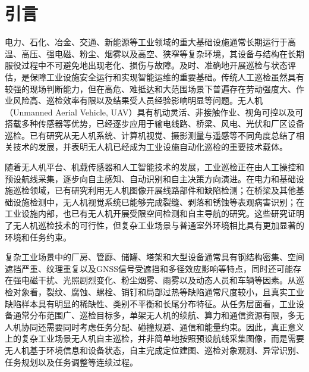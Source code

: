 \section{引言}

电力、石化、冶金、交通、新能源等工业领域的重大基础设施通常长期运行于高温、高压、强电磁、粉尘、烟雾以及高空、狭窄等复杂环境，其设备与结构在长期服役过程中不可避免地出现老化、损伤与故障。及时、准确地开展巡检与状态评估，是保障工业设施安全运行和实现智能运维的重要基础。传统人工巡检虽然具有较强的现场判断能力，但在高危、难抵达和大范围场景下普遍存在劳动强度大、作业风险高、巡检效率有限以及结果受人员经验影响明显等问题。无人机（Unmanned Aerial Vehicle, UAV）具有机动灵活、非接触作业、视角可控以及可搭载多种传感器等优势，已经逐步应用于输电线路、桥梁、风电、光伏和厂区设备巡检\cite{shakhatreh2019survey,floreano2015science,kumar2012opportunities,cai2014survey,kendoul2012survey}。已有研究从无人机系统、计算机视觉、摄影测量与遥感等不同角度总结了相关技术的发展，并表明无人机已经成为工业设施自动化巡检的重要技术载体\cite{kanellakis2017survey,colomina2014unmanned,nex2014uav}。

随着无人机平台、机载传感器和人工智能技术的发展，工业巡检正在由人工操控和预设航线采集，逐步向自主感知、自动识别和自主决策方向演进。在电力和基础设施巡检领域，已有研究利用无人机图像开展线路部件和缺陷检测\cite{nguyen2018automatic,miao2020uav,zhouwq2024review}；在桥梁及其他基础设施检测中，无人机视觉系统已能够完成裂缝、剥落和锈蚀等表观病害识别\cite{morgenthal2014quality,ham2016visual,dorafshan2018bridge,spencer2019advances}；在工业设施内部，也已有无人机开展受限空间检测和自主导航的研究\cite{nikolic2013uav,ozaslan2017autonomous,petrlik2020robust}。这些研究证明了无人机巡检技术的可行性，但复杂工业场景与普通室外环境相比具有更加显著的环境和任务约束。

复杂工业场景中的厂房、管廊、储罐、塔架和大型设备通常具有钢结构密集、空间遮挡严重、纹理重复以及GNSS信号受遮挡和多径效应影响等特点，同时还可能存在强电磁干扰、光照剧烈变化、粉尘烟雾、雨雾以及动态人员和车辆等因素\cite{scaramuzza2014vision,stoecker2017review,lvyang2019sense}。从巡检对象看，裂纹、腐蚀、螺栓、销钉和局部过热等缺陷通常尺度较小，且真实工业缺陷样本具有明显的稀缺性、类别不平衡和长尾分布特征\cite{taox2021survey,nguyen2018automatic}。从任务层面看，工业设备通常分布范围广、巡检目标多，单架无人机的续航、算力和通信资源有限，多无人机协同还需要同时考虑任务分配、碰撞规避、通信和能量约束\cite{zeng2016wireless,mozaffari2019tutorial,zhang2019energy}。因此，真正意义上的复杂工业场景无人机自主巡检，并非简单地按照预设航线采集图像，而是需要无人机基于环境信息和设备状态，自主完成定位建图、巡检对象观测、异常识别、任务规划以及任务调整等连续过程。


